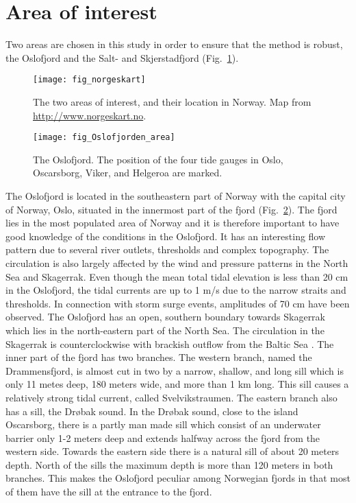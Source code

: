\section{Area of interest}
Two areas are chosen in this study in order to ensure that the method is robust, the Oslofjord and the Salt- and Skjerstadfjord (Fig.~\ref{fig:area0}).

\begin{figure}[!t]
\centering
\texttt{[image: fig\_norgeskart]}
\caption{The two areas of interest, and their location in Norway. Map from \url{http://www.norgeskart.no}.}
\label{fig:area0}
\end{figure}

\begin{figure}[!t]
\centering
\texttt{[image: fig\_Oslofjorden\_area]}
\caption{The Oslofjord. The position of the four tide gauges in Oslo, Oscarsborg, Viker, and Helgeroa are marked.}
\label{fig:area1}
\end{figure}

The Oslofjord is located in the southeastern part of Norway with the capital city of Norway, Oslo, situated in the innermost part of the fjord (Fig.~\ref{fig:area1}). The fjord lies in the most populated area of Norway and it is therefore important to have good knowledge of the conditions in the Oslofjord. It has an interesting flow pattern due to several river outlets, thresholds and complex topography. The circulation is also largely affected by the wind and pressure patterns in the North Sea and Skagerrak. 
Even though the mean total tidal elevation is less than 20 cm in the Oslofjord, the tidal currents are up to 1 m/s due to the narrow straits and thresholds. In connection with storm surge events, amplitudes of 70 cm have been observed. The Oslofjord has an open, southern boundary towards Skagerrak which lies in the north-eastern part of the North Sea. The circulation in the Skagerrak is counterclockwise with brackish outflow from the Baltic Sea \cite[]{rodhe96,svendsen96}. 
The inner part of the fjord has two branches. The western branch, named the Drammensfjord, is almost cut in two by a narrow, shallow, and long sill which is only 11 metes deep, 180 meters wide, and more than 1 km long. This sill causes a relatively strong tidal current, called Svelvikstraumen. The eastern branch also has a sill, the Dr{\o}bak sound. In the Dr{\o}bak sound, close to the island Oscarsborg, there is a partly man made sill which consist of an underwater barrier only 1-2 meters deep and extends halfway across the fjord from the western side. Towards the eastern side there is a natural sill of about 20 meters depth. North of the sills the maximum depth is more than 120 meters in both branches.  This makes the Oslofjord peculiar among Norwegian fjords in that most of them have the sill at the entrance to the fjord.

